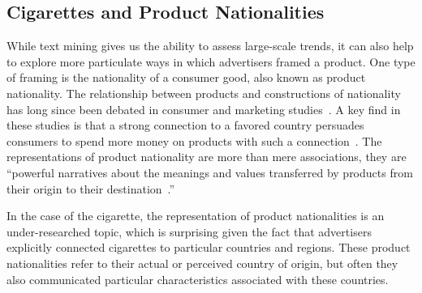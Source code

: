 \documentclass[USenglish]{article}
\begin{document}
\subsection{Cigarettes and Product Nationalities}
While text mining gives us the ability to assess large-scale trends, it can also help to explore more particulate ways in which advertisers framed a product. One type of framing is the nationality of a consumer good, also known as product nationality. The relationship between products and constructions of nationality has long since been debated in consumer and marketing studies~\cite{thakor_brand_1996, hull_cultural_2016}. A key find in these studies is that a strong connection to a favored country persuades consumers to spend more money on products with such a connection~\cite{menapace_consumers_2011}. The representations of product nationality are more than mere associations, they are ``powerful narratives about the meanings and values transferred by products from their origin to their destination~\cite{askegaard_product-country_1998}.''

In the case of the cigarette, the representation of product nationalities is an under-researched topic, which is surprising given the fact that advertisers explicitly connected cigarettes to particular countries and regions.  These product nationalities refer to their actual or perceived country of origin, but often they also communicated particular characteristics associated with these countries. 
\end{document}
